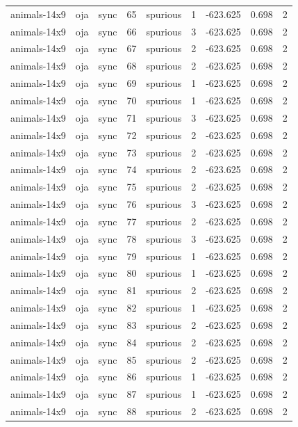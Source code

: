 \begin{tabular}{lllrlrrrr}
animals-14x9 & oja & sync & 65 & spurious & 1 & -623.625 & 0.698 & 2 \\
animals-14x9 & oja & sync & 66 & spurious & 3 & -623.625 & 0.698 & 2 \\
animals-14x9 & oja & sync & 67 & spurious & 2 & -623.625 & 0.698 & 2 \\
animals-14x9 & oja & sync & 68 & spurious & 2 & -623.625 & 0.698 & 2 \\
animals-14x9 & oja & sync & 69 & spurious & 1 & -623.625 & 0.698 & 2 \\
animals-14x9 & oja & sync & 70 & spurious & 1 & -623.625 & 0.698 & 2 \\
animals-14x9 & oja & sync & 71 & spurious & 3 & -623.625 & 0.698 & 2 \\
animals-14x9 & oja & sync & 72 & spurious & 2 & -623.625 & 0.698 & 2 \\
animals-14x9 & oja & sync & 73 & spurious & 2 & -623.625 & 0.698 & 2 \\
animals-14x9 & oja & sync & 74 & spurious & 2 & -623.625 & 0.698 & 2 \\
animals-14x9 & oja & sync & 75 & spurious & 2 & -623.625 & 0.698 & 2 \\
animals-14x9 & oja & sync & 76 & spurious & 3 & -623.625 & 0.698 & 2 \\
animals-14x9 & oja & sync & 77 & spurious & 2 & -623.625 & 0.698 & 2 \\
animals-14x9 & oja & sync & 78 & spurious & 3 & -623.625 & 0.698 & 2 \\
animals-14x9 & oja & sync & 79 & spurious & 1 & -623.625 & 0.698 & 2 \\
animals-14x9 & oja & sync & 80 & spurious & 1 & -623.625 & 0.698 & 2 \\
animals-14x9 & oja & sync & 81 & spurious & 2 & -623.625 & 0.698 & 2 \\
animals-14x9 & oja & sync & 82 & spurious & 1 & -623.625 & 0.698 & 2 \\
animals-14x9 & oja & sync & 83 & spurious & 2 & -623.625 & 0.698 & 2 \\
animals-14x9 & oja & sync & 84 & spurious & 2 & -623.625 & 0.698 & 2 \\
animals-14x9 & oja & sync & 85 & spurious & 2 & -623.625 & 0.698 & 2 \\
animals-14x9 & oja & sync & 86 & spurious & 1 & -623.625 & 0.698 & 2 \\
animals-14x9 & oja & sync & 87 & spurious & 1 & -623.625 & 0.698 & 2 \\
animals-14x9 & oja & sync & 88 & spurious & 2 & -623.625 & 0.698 & 2 \\

\end{tabular}
